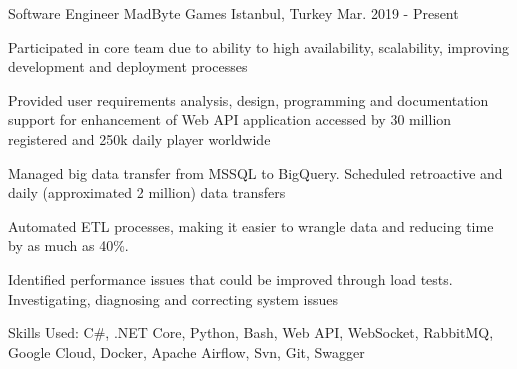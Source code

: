 

\begin{cventries}

  \cventry
    {Software Engineer} %
    {MadByte Games} %
    {Istanbul, Turkey} %
    {Mar. 2019 - Present} %
    {
      \begin{cvitems} %
        \item {Participated in core team due to ability to high availability, scalability, improving development and deployment processes}
        \item {Provided user requirements analysis, design, programming and documentation support for enhancement of Web API application accessed by 30 million registered and 250k daily player worldwide}
        \item {Managed big data transfer from MSSQL to BigQuery. Scheduled retroactive and daily (approximated 2 million) data transfers}
        \item {Automated ETL processes, making it easier to wrangle data and reducing time by as much as 40\%.}
        \item {Identified performance issues that could be improved through load tests. Investigating, diagnosing and correcting system issues}
        \item {Skills Used: C\#, .NET Core, Python, Bash, Web API, WebSocket, RabbitMQ, Google Cloud, Docker, Apache Airflow, Svn, Git, Swagger}
      \end{cvitems}
    }


\end{cventries}
